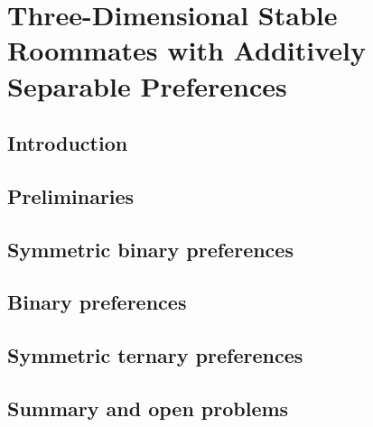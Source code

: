 \chapter{Three-Dimensional Stable Roommates with Additively Separable Preferences}
\label{c:threed_sr_as}

\section{Introduction}
\label{sec:threed_sr_as_intro}


\section{Preliminaries}
\label{sec:threed_sr_as_model}


\section{Symmetric binary preferences}
\label{sec:threed_sr_as_symmetricbinary}


\section{Binary preferences}
\label{sec:threed_sr_as_generalbinary}


\section{Symmetric ternary preferences}
\label{sec:threed_sr_as_symmetricternary}


\section{Summary and open problems}
\label{sec:threed_sr_as_conclusion}


% 